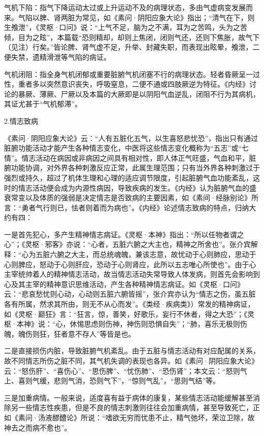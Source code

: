 \documentclass[draft,12pt]{ctexbook}
\begin{document}
气机下陷：指气下降运动太过或上升运动不及的病理状态，多由气虚病变发展而来。气陷以脾、肾两脏为常见，如《素问·阴阳应象大论》指出；“清气在下，则生飧泄”，《灵枢·口问》说：“上气不足，脑为之不满，耳为之苦鸣，头为之苦倾，目为之眩”，本篇载“恐则精却，却则上焦闭，闭则气还，还则下焦胀，故气下（见注）行矣。”皆论脾、肾气虚不足，升举、封藏失职，而表现出眩晕，飧泄，二便失禁，遗精滑泄等气陷的病证。

气机闭阻：指全身气机闭郁或重要脏腑气机闭塞不行的病理状态。轻者昏厥呈一过性，重者多以突然意识丧失，呼吸窒息，二便不通或四肢厥逆为特征。《内经》讨论的暴厥、薄厥、尸厥以及本篇的大厥即是以阴阳气血逆乱，闭阻不行为其病机，其证尤甚于“气机郁滞”。

2.情志致病

《素问·阴阳应象大论》云：“人有五脏化五气，以生喜怒悲忧恐”，指出只有通过脏腑功能活动才能产生各种情志变化，中医将这些情志变化概称为“五志”或“七情”。情志活动在病因或非病因之间具有相对性，即人体正气旺盛，气血和平，脏腑功能协调，对外界各种刺激反应正常，此属生理范围；只有当外界各种刺激过于强烈或持久，超过了机体生理和心理的适应调节限度，引起脏腑气血功能紊乱，这时的情志活动便会成为内源性病因，导致疾病的发生。《内经》认为脏腑气血的盛衰常变以及体质的强弱是决定情志是否致病的主要因素，如《素间·经脉别论》所言：“勇者气行则已，怯者则着而为病也”。《内经》论述情志致病的特点，归纳大约有四：

一是首先犯心，多产生精神情志病证。《灵枢·本神》指出：“所以任物者谓之心”；《灵枢·邪客》亦说：“心者，五脏六腑之大主也，精神之所舍也”。张介宾解释：“心为五脏六腑之大主，而总统魂魄，兼该志意，故忧动于心则肺应，思动于心则脾应，怒动于心则肝应，恐动于心则肾应，此所以五志唯心所使也”。由于心主宰统帅着人的精神情志活动，故当情志活动失常导致人体发病，则首先会影响到心及其主宰的精神意识思维活动，产生各种精神情志病证。如《灵枢·口问》云：“悲哀愁忧则心动，心动则五脏六腑皆摇”，张介宾亦认为“情志之伤，虽五脏各有所属，然求其所由，则无不从心而发”。《类经·疾病类》）常发的精神病证，如《灵枢·巅狂》言：“狂言，惊，善笑，好歌乐，妄行不休者，得之大恐”；《灵枢·本神》说：“心，休惕思虑则伤神，神伤则恐惧自失”；“肺，喜乐无极则伤魄，魄伤则狂，狂者意不存人”等皆是也。

二是直接损伤内脏，导致脏腑气机紊乱。由于五脏与情志活动有对应配属的关系，故不同情志所伤之脏不同，其气机失调的表现也各异。如《素问·阴阳应象大论》云：“怒伤肝”、“喜伤心”、“思伤脾”、“忧伤肺”、“恐伤肾”；本文云：“怒则气上、喜则气缓，悲则气消，恐则气下”，“惊则气乱”，“思则气结”等。

三是加重病情。一般来说，适度喜有益于病体的康复，某些情志活动能缓解甚至消除另一些情志性疾患，但是不良的情志刺激则往往会加重病情，甚至导致死亡，正如《素问·汤液醪醴论》所说：“嗜欲无穷而忧患不止，精气弛坏，荣泣卫除，故神去之而病不愈也”。
\end{document}
